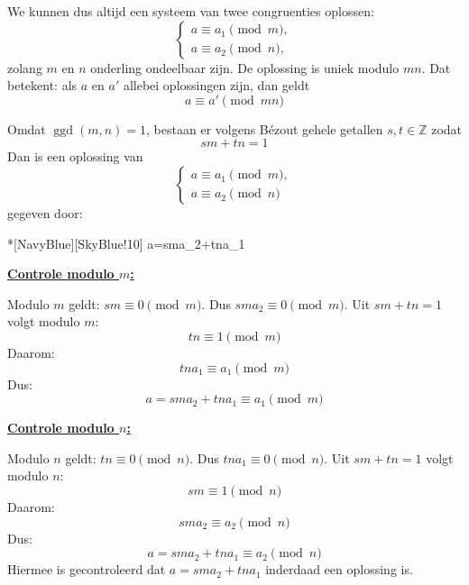
We kunnen dus altijd een systeem van twee congruenties oplossen:
\begin{equation*}
    \begin{cases}
        a\equiv a_1 \pmod m,\\
        a\equiv a_2 \pmod n,
    \end{cases}
\end{equation*}
zolang $m$ en $n$ onderling ondeelbaar zijn. De oplossing is uniek modulo $mn$. Dat betekent: als $a$ en $a'$ allebei oplossingen zijn, dan geldt
\begin{equation*}
    a\equiv a' \pmod{mn}
\end{equation*}


Omdat $\operatorname{ggd}(m,n)=1$, bestaan er volgens Bézout gehele getallen $s,t\in\mathbb{Z}$ zodat
\begin{equation*}
    sm + tn = 1
\end{equation*}
Dan is een oplossing van
\begin{equation*}
    \begin{cases}
        a\equiv a_1 \pmod m,\\
        a\equiv a_2 \pmod n
    \end{cases}
\end{equation*}
gegeven door:
\begin{equationbox}*[NavyBlue][SkyBlue!10]
    a=sma_2+tna_1
\end{equationbox}

\textbf{\underline{Controle modulo $m$:}}

Modulo $m$ geldt: $sm\equiv 0 \pmod m$. Dus $sma_2\equiv 0 \pmod m$. Uit $sm+tn=1$ volgt modulo $m$:
\begin{equation*}
    tn\equiv 1 \pmod m
\end{equation*}
Daarom:
\begin{equation*}
    tna_1\equiv a_1 \pmod m
\end{equation*}
Dus:
\begin{equation*}
    a=sma_2+tna_1\equiv a_1 \pmod m
\end{equation*}

\textbf{\underline{Controle modulo $n$:}}

Modulo $n$ geldt: $tn\equiv 0 \pmod n$. Dus $tna_1\equiv 0 \pmod n$. Uit $sm+tn=1$ volgt modulo $n$:
\begin{equation*}
    sm\equiv 1 \pmod n
\end{equation*}
Daarom:
\begin{equation*}
    sma_2\equiv a_2 \pmod n
\end{equation*}
Dus:
\begin{equation*}
    a=sma_2+tna_1\equiv a_2 \pmod n
\end{equation*}
Hiermee is gecontroleerd dat $a=sma_2+tna_1$ inderdaad een oplossing is.

